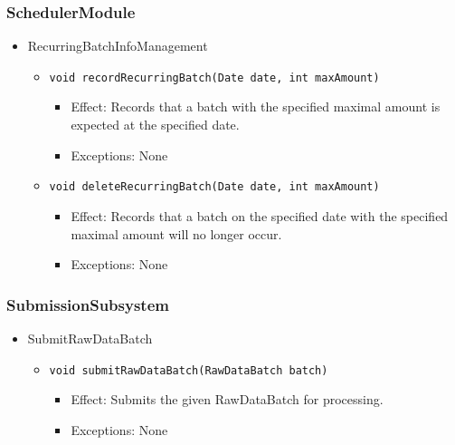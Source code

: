 \documentclass[a4paper,10pt]{article}
\begin{document}
\subsubsection*{SchedulerModule}
\begin{itemize}
	\item RecurringBatchInfoManagement
	\begin{itemize}
		\item \texttt{void recordRecurringBatch(Date date, int maxAmount)}
		\begin{itemize}
			\item Effect: Records that a batch with the specified maximal amount is expected at the specified date.
			\item Exceptions: None
		\end{itemize}
		
		\item \texttt{void deleteRecurringBatch(Date date, int maxAmount)}
		\begin{itemize}
			\item Effect: Records that a batch on the specified date with the specified maximal amount will no longer occur.
			\item Exceptions: None
		\end{itemize}
	\end{itemize}
\end{itemize}

\subsubsection*{SubmissionSubsystem}
\begin{itemize}
	\item SubmitRawDataBatch
	\begin{itemize}
		\item \texttt{void submitRawDataBatch(RawDataBatch batch)}
		\begin{itemize}
			\item Effect: Submits the given RawDataBatch for processing.
			\item Exceptions: None
		\end{itemize}
	\end{itemize}
\end{itemize}
\end{document}
